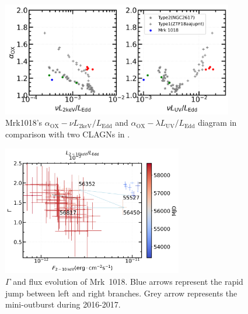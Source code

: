 \documentclass[twocolumn]{aastex63}
\begin{document}
\begin{figure}
\centering
	\includegraphics[width=0.9\textwidth]{./pic/Mrk1018_subplots_plus_2individuals_alpha_ox_L_x_Luv_rate.png}
    \caption{Mrk1018's $\alpha_\mathrm{OX}-\nu L_\mathrm{2keV}/L_\mathrm{Edd}$ and $\alpha_\mathrm{OX}-\lambda L_\mathrm{UV}/L_\mathrm{Edd}$ diagram in comparison with two CLAGNs in \citet{2019arXiv190904676R}. }   
    \label{fig:alpha_ox_lx_luv}
\end{figure}

\begin{figure}
\centering
	\includegraphics[width=0.7\textwidth]{./pic/xrayappendgood-errorbar-f-g-tmap.png}
    \caption{$\Gamma$ and flux evolution of Mrk~1018. Blue arrows represent the rapid jump between left and right branches. Grey arrow represents the mini-outburst during 2016-2017.}
    \label{fig:xrayappendgood-fandg-tmap}
\end{figure}
\end{document}
